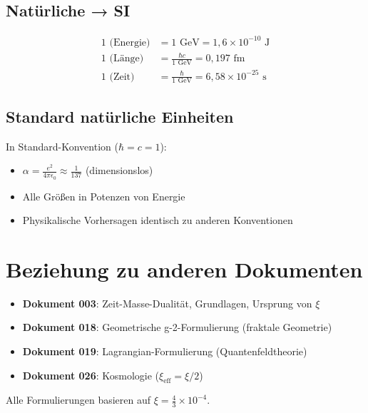 	\subsection{Natürliche → SI}
	
	\begin{align}
		1 \text{ (Energie)} &= 1 \text{ GeV} = 1{,}6 \times 10^{-10} \text{ J} \\
		1 \text{ (Länge)} &= \frac{\hbar c}{1 \text{ GeV}} = 0{,}197 \text{ fm} \\
		1 \text{ (Zeit)} &= \frac{\hbar}{1 \text{ GeV}} = 6{,}58 \times 10^{-25} \text{ s}
	\end{align}
	
	\subsection{Standard natürliche Einheiten}
	
	In Standard-Konvention ($\hbar = c = 1$):
	\begin{itemize}
		\item $\alpha = \frac{e^2}{4\pi\epsilon_0} \approx \frac{1}{137}$ (dimensionslos)
		\item Alle Größen in Potenzen von Energie
		\item Physikalische Vorhersagen identisch zu anderen Konventionen
	\end{itemize}
	
	\section{Beziehung zu anderen Dokumenten}
	
	\begin{itemize}
		\item \textbf{Dokument 003}: Zeit-Masse-Dualität, Grundlagen, Ursprung von $\xi$
		\item \textbf{Dokument 018}: Geometrische g-2-Formulierung (fraktale Geometrie)
		\item \textbf{Dokument 019}: Lagrangian-Formulierung (Quantenfeldtheorie)
		\item \textbf{Dokument 026}: Kosmologie ($\xi_{\text{eff}} = \xi/2$)
	\end{itemize}
	
	Alle Formulierungen basieren auf $\xi = \frac{4}{3} \times 10^{-4}$.
	